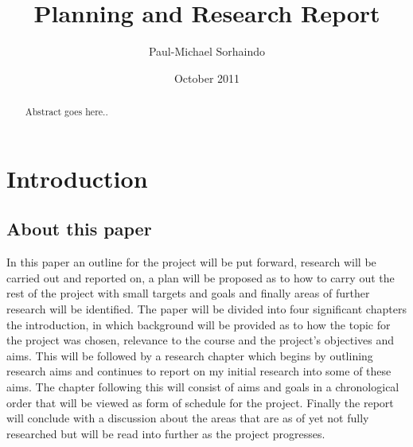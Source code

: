 \documentclass{report}
\begin{document}
\title {Planning and Research Report}
\author {Paul-Michael Sorhaindo}
\date {October 2011}
\maketitle
\begin{abstract}
Abstract goes here..
\end{abstract}


\chapter{Introduction}
\section{About this paper}
In this paper an outline for the project will be put forward, research will be carried out and reported on, a plan will be proposed as to how to carry out the rest of the project with small targets and goals and finally areas of further research will be identified. The paper will be divided into four significant chapters the introduction, in which background will be provided as to how the topic for the project was chosen, relevance to the course and the project's objectives and aims. This will be followed by a research chapter which begins by outlining research aims and continues to report on my initial research into some of these aims. The chapter following this will consist of aims and goals in a chronological order that will be viewed as form of schedule for the project. Finally the report will conclude with a discussion about the areas that are as of yet not fully researched but will be read into further as the project progresses.
\end{document}
